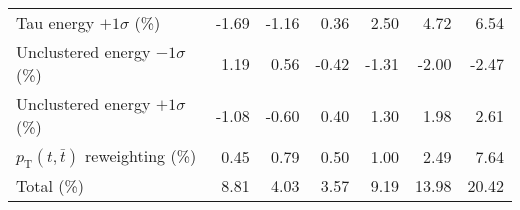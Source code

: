 \begin{table}[htbp]
{\begin{tabular}{lrrrrrr}
Tau energy $+1\sigma$ (\%) & -1.69 & -1.16 & 0.36 & 2.50 & 4.72 & 6.54 \\ 
Unclustered energy $-1\sigma$ (\%) & 1.19 & 0.56 & -0.42 & -1.31 & -2.00 & -2.47 \\ 
Unclustered energy $+1\sigma$ (\%) & -1.08 & -0.60 & 0.40 & 1.30 & 1.98 & 2.61 \\ 
$p_\mathrm{T}(t,\bar{t})$ reweighting (\%) & 0.45 & 0.79 & 0.50 & 1.00 & 2.49 & 7.64 \\ 
\hline 
Total (\%) & 8.81  & 4.03  & 3.57  & 9.19  & 13.98  & 20.42 \\ 
\hline 
\end{tabular}
}
\end{table}
